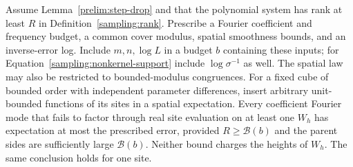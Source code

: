 \begin{lemma}
\label{sampling:analytic-removal}
Assume Lemma~\ref{prelim:step-drop} and that the polynomial system has
rank at least $R$ in Definition~\ref{sampling:rank}.  Prescribe a Fourier coefficient and
frequency budget, a common cover modulus, spatial smoothness bounds, and
an inverse-error log.  Include $m,n,\log L$ in a budget $b$ containing
these inputs; for Equation~\eqref{sampling:nonkernel-support} include
$\log\sigma^{-1}$ as well.  The spatial law may also be restricted to
bounded-modulus
congruences.  For a fixed cube of bounded order with independent parameter
differences, insert arbitrary unit-bounded functions of its sites in a
spatial expectation.  Every coefficient Fourier mode that fails to factor
through real site evaluation on at least one $W_h$ has expectation at most
the prescribed error, provided $R\ge\mathcal B(b)$ and the parent sides
are sufficiently large $\mathcal B(b)$.  Neither bound charges the heights
of $W_h$.  The same conclusion holds for one site.
\end{lemma}
